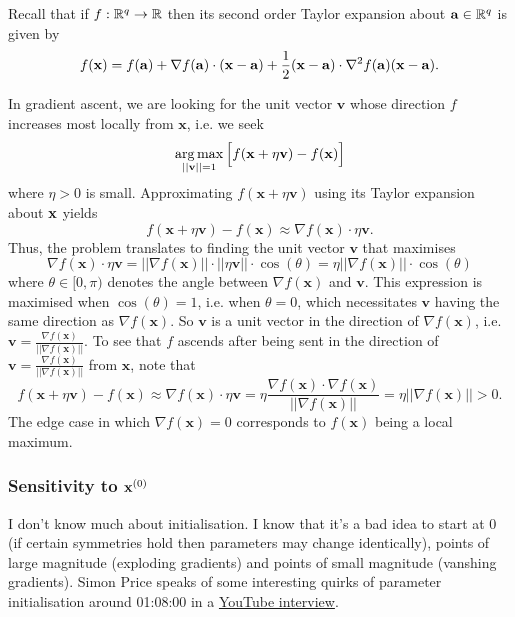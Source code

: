 \documentclass[11pt]{article}
\begin{document}
\begin{tcolorbox}[title={\centering\textbf{Multivariate Taylor expansion}}, colback=myLightBlue, colbacktitle=myDarkBlue, colframe=myDarkBlue, coltitle=white]
    Recall that if $f:\mathbb{R}^q\to\mathbb{R}$ then its second order Taylor expansion about $\mathbf{a}\in\mathbb{R}^q$ is given by
    $$
    f(\mathbf{x})
    =
    f(\mathbf{a})+\nabla f(\mathbf{a})\cdot(\mathbf{x}-\mathbf{a})+\frac{1}{2}(\mathbf{x}-\mathbf{a})\cdot\nabla^2 f(\mathbf{a})(\mathbf{x}-\mathbf{a}).
    $$
\end{tcolorbox}

In gradient ascent, we are looking for the unit vector $\mathbf{v}$ whose direction $f$ increases most locally from $\mathbf{x}$, i.e. we seek
$$\operatorname*{arg\,max}_{||\mathbf{v}||=1}\Big[f(\mathbf{x}+\eta\mathbf{v})-f(\mathbf{x})\Big]$$
where $\eta>0$ is small. Approximating $f(\mathbf{x}+\eta\mathbf{v})$ using its Taylor expansion about $\mathbf{x}$ yields
$$
f(\mathbf{x}+\eta\mathbf{v})-f(\mathbf{x})
\approx
\nabla f(\mathbf{x})\cdot\eta\mathbf{v}.
$$
Thus, the problem translates to finding the unit vector $\mathbf{v}$ that maximises
$$
\nabla f(\mathbf{x})\cdot\eta\mathbf{v}=||\nabla f(\mathbf{x})||\cdot||\eta\mathbf{v}||\cdot\cos(\theta)=\eta||\nabla f(\mathbf{x})||\cdot\cos(\theta)
$$
where $\theta\in[0,\pi)$ denotes the angle between $\nabla f(\mathbf{x})$ and $\mathbf{v}$. This expression is maximised when $\cos(\theta)=1$, i.e. when $\theta=0$, which necessitates $\mathbf{v}$ having the same direction as $\nabla f(\mathbf{x})$. So $\mathbf{v}$ is a unit vector in the direction of $\nabla f(\mathbf{x})$, i.e. $\mathbf{v}=\frac{\nabla f(\mathbf{x})}{||\nabla f(\mathbf{x})||}$. To see that $f$ ascends after being sent in the direction of $\mathbf{v}=\frac{\nabla f(\mathbf{x})}{||\nabla f(\mathbf{x})||}$ from $\mathbf{x}$, note that
$$
f(\mathbf{x}+\eta\mathbf{v})-f(\mathbf{x})
\approx
\nabla f(\mathbf{x})\cdot\eta\mathbf{v}
=
\eta\frac{\nabla f(\mathbf{x})\cdot\nabla f(\mathbf{x})}{||\nabla f(\mathbf{x})||}
=
\eta||\nabla f(\mathbf{x})||
>
0.
$$
The edge case in which $\nabla f(\mathbf{x})=0$ corresponds to $f(\mathbf{x})$ being a local maximum.

\subsubsection{Sensitivity to $\mathbf{x}^{(0)}$}
I don't know much about initialisation. I know that it's a bad idea to start at 0 (if certain symmetries hold then parameters may change identically), points of large magnitude (exploding gradients) and points of small magnitude (vanshing gradients). Simon Price speaks of some interesting quirks of parameter initialisation around 01:08:00 in a \href{https://www.youtube.com/watch?v=sJXn4Cl4oww&list=PLwFLAA-F1PgpU9lgxOdhjILkMXUagGnea&ab_channel=MachineLearningStreetTalk}{YouTube interview}.
\end{document}
